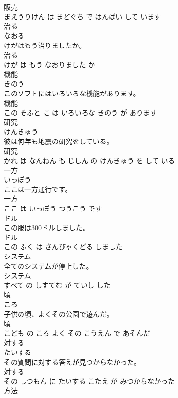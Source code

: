 \documentclass[8pt]{extreport}
\begin{document}
\begin{CJK}{UTF8}{min}
\\	販売 
\\	まえうりけん は まどぐち で はんばい して います			
\\	治る	
\\	なおる			
\\	けがはもう治りましたか。	
\\	治る 
\\	けが は もう なおりました か			
\\	機能	
\\	きのう			
\\	このソフトにはいろいろな機能があります。	
\\	機能 
\\	この そふと に は いろいろな きのう が あります			
\\	研究	
\\	けんきゅう			
\\	彼は何年も地震の研究をしている。	
\\	研究 
\\	かれ は なんねん も じしん の けんきゅう を して いる			
\\	一方	
\\	いっぽう			
\\	ここは一方通行です。	
\\	一方 
\\	ここ は いっぽう つうこう です			
\\	ドル	
\\	この服は300ドルしました。	
\\	ドル 
\\	この ふく は さんびゃくどる しました			
\\	システム	
\\	全てのシステムが停止した。	
\\	システム 
\\	すべて の しすてむ が ていし した			
\\	頃	
\\	ころ			
\\	子供の頃、よくその公園で遊んだ。	
\\	頃 
\\	こども の ころ よく その こうえん で あそんだ			
\\	対する	
\\	たいする			
\\	その質問に対する答えが見つからなかった。	
\\	対する 
\\	その しつもん に たいする こたえ が みつからなかった			
\\	方法	

\end{CJK}
\end{document}
